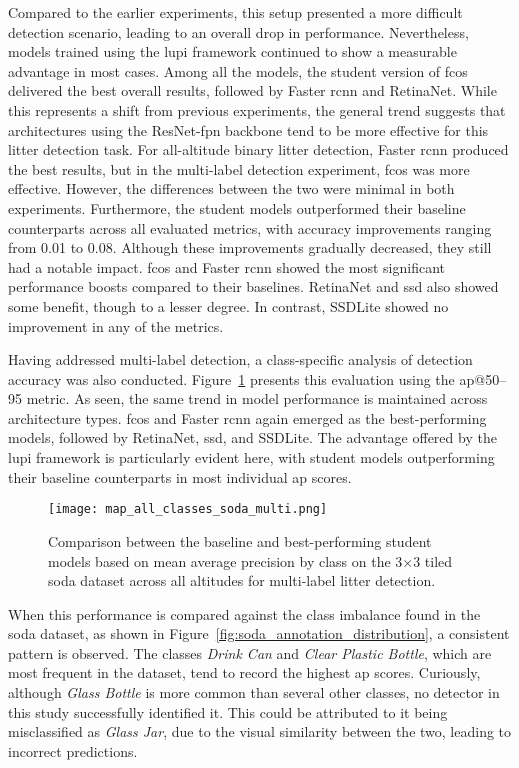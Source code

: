 Compared to the earlier experiments, this setup presented a more difficult detection scenario, leading to an overall drop in performance. Nevertheless, models trained using the \gls{lupi} framework continued to show a measurable advantage in most cases.
Among all the models, the student version of \gls{fcos} delivered the best overall results, followed by Faster \gls{rcnn} and RetinaNet. While this represents a shift from previous experiments, the general trend suggests that architectures using the ResNet-\gls{fpn} backbone tend to be more effective for this litter detection task. For all-altitude binary litter detection, Faster \gls{rcnn} produced the best results, but in the multi-label detection experiment, \gls{fcos} was more effective. However, the differences between the two were minimal in both experiments.
Furthermore, the student models outperformed their baseline counterparts across all evaluated metrics, with accuracy improvements ranging from 0.01 to 0.08. Although these improvements gradually decreased, they still had a notable impact. \gls{fcos} and Faster \gls{rcnn} showed the most significant performance boosts compared to their baselines. RetinaNet and \gls{ssd} also showed some benefit, though to a lesser degree. In contrast, SSDLite showed no improvement in any of the metrics.

Having addressed multi-label detection, a class-specific analysis of detection accuracy was also conducted. Figure~\ref{fig:soda_tiled_multi_per_class} presents this evaluation using the \gls{ap}@50--95 metric. As seen, the same trend in model performance is maintained across architecture types. \gls{fcos} and Faster \gls{rcnn} again emerged as the best-performing models, followed by RetinaNet, \gls{ssd}, and SSDLite. The advantage offered by the \gls{lupi} framework is particularly evident here, with student models outperforming their baseline counterparts in most individual \gls{ap} scores.

\begin{figure}[!ht]
    \centering
    \texttt{[image: map\_all\_classes\_soda\_multi.png]}
    \caption{Comparison between the baseline and best-performing student models based on mean average precision by class on the 3$\times$3 tiled \gls{soda} dataset across all altitudes for multi-label litter detection.}
    \label{fig:soda_tiled_multi_per_class}
\end{figure}

When this performance is compared against the class imbalance found in the \gls{soda} dataset, as shown in Figure~\ref{fig:soda_annotation_distribution}, a consistent pattern is observed. The classes \textit{Drink Can} and \textit{Clear Plastic Bottle}, which are most frequent in the dataset, tend to record the highest \gls{ap} scores. Curiously, although \textit{Glass Bottle} is more common than several other classes, no detector in this study successfully identified it. This could be attributed to it being misclassified as \textit{Glass Jar}, due to the visual similarity between the two, leading to incorrect predictions.

